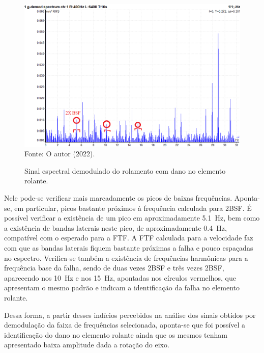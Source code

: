 \documentclass[
	12pt,				
	oneside,			
	a4paper,			
	english,			
	brazil,	
	sumario=abnt-6027-2012		
	]{abntex2ppgsi}
\begin{document}
\begin{figure}[H]
\centering
\caption {Sinal espectral demodulado do rolamento com dano no elemento rolante.}
\includegraphics[width=\textwidth,keepaspectratio]{2bsf_anotado} \\
Fonte: O autor (2022).
\label{2bsf_anotado_certo}
\end{figure}

Nele pode-se verificar mais marcadamente os picos de baixas frequências. Aponta-se, em particular, picos bastante próximos à frequência calculada para 2BSF. É possível verificar a existência de um pico em aproximadamente \SI{5,1}{\hertz}, bem como a existência de bandas laterais neste pico, de aproximadamente \SI{0,4}{\hertz}, compatível com o esperado para a FTF. A FTF calculada para a velocidade faz com que as bandas laterais fiquem bastante próximas a falha e pouco espaçadas no espectro. Verifica-se também a existência de frequências harmônicas para a frequência base da falha, sendo de duas vezes 2BSF e três vezes 2BSF, aparecendo nos \SI{10}{\hertz} e nos \SI{15}{\hertz}, apontadas nos círculos vermelhos, que apresentam o mesmo padrão e indicam a identificação da falha no elemento rolante. 

Dessa forma, a partir desses indícios percebidos na análise dos sinais obtidos por demodulação da faixa de frequências selecionada, aponta-se que foi possível a identificação do dano no elemento rolante ainda que os mesmos tenham apresentado baixa amplitude dada a rotação do eixo. 

\subsection{}
\end{document}
